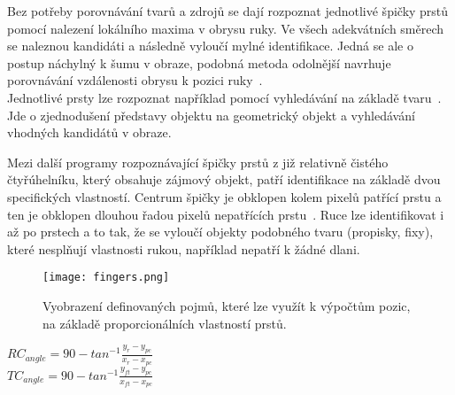 Bez potřeby porovnávání tvarů a zdrojů se dají rozpoznat jednotlivé špičky prstů pomocí nalezení lokálního maxima v obrysu ruky. Ve všech adekvátních směrech se naleznou kandidáti a následně vyloučí mylné identifikace. Jedná se ale o postup náchylný k šumu v obraze, podobná metoda odolnější navrhuje porovnávání vzdálenosti obrysu k pozici ruky~\cite{3}.\\
Jednotlivé prsty lze rozpoznat například pomocí vyhledávání na základě tvaru~\cite{4}. Jde o zjednodušení představy objektu na geometrický objekt a vyhledávání vhodných kandidátů v obraze. 

Mezi další programy rozpoznávající špičky prstů z již relativně čistého čtyřúhelníku, který obsahuje zájmový objekt, patří identifikace na základě dvou specifických vlastností. Centrum špičky je obklopen kolem pixelů patřící prstu a ten je obklopen dlouhou řadou pixelů nepatřících prstu~\cite{14}. Ruce lze identifikovat i až po prstech a to tak, že se vyloučí objekty podobného tvaru (propisky, fixy), které nesplňují vlastnosti rukou, například nepatří k žádné dlani.




\begin{figure}[h]
\centering
\texttt{[image: fingers.png]}
\caption{Vyobrazení definovaných pojmů, které lze využít k výpočtům pozic, na základě proporcionálních vlastností prstů. ~\cite{13} }

\end{figure}
\begin{center}
$RC_{angle} = 90 - tan^{-1} \frac{y_{r}-y_{pc}}{x_{r} - x_{pc}}$ \\
$TC_{angle} = 90 - tan^{-1} \frac{y_{ft}-y_{pc}}{x_{ft} - x_{pc}}$ 
\end{center}
